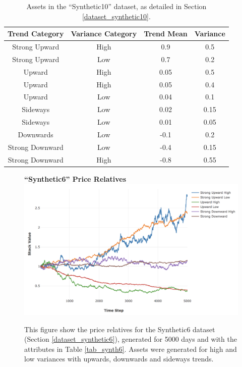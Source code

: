 \documentclass[a4paper,11pt,oneside]{article}
\theoremstyle{plain}
\theoremstyle{definition}
\begin{document}
	\begin{table}[H]
		\centering
		\small
		\begin{tabular}{|c|c|c|c|}
			\hline
			\textbf{Trend Category} &\textbf{Variance Category} & \textbf{Trend Mean} & \textbf{Variance}\\\hline	
			{Strong Upward} 		& {High} & {0.9} & {0.5} \\\hline
			{Strong Upward} 		& {Low} & {0.7} & {0.2} \\\hline
			{Upward} 					& {High} & {0.05} & {0.5} \\\hline
			{Upward} 					& {High} & {0.05} & {0.4} \\\hline
			{Upward} 					& {Low} & {0.04} & {0.1} \\\hline
			{Sideways} 					& {Low} & {0.02} & {0.15} \\\hline
			{Sideways}					& {Low} & {0.01} & {0.05} \\\hline
			{Downwards}				& {Low} & {-0.1} & {0.2} \\\hline
			{Strong Downward} 	& {Low} & {-0.4} & {0.15} \\\hline
			{Strong Downward}	& {High} & {-0.8} & {0.55} \\\hline
		\end{tabular}
		\newline\newline
		\caption{Assets in the ``Synthetic10'' dataset, as detailed in Section \ref{dataset_synthetic10}.}\label{tab_synth10}
	\end{table}
	
	\begin{figure}[H]
		\centering
		\textbf{``Synthetic6'' Price Relatives}
		\includegraphics[scale=0.45]{images/results/prices/synthetic6_prices.png} 
		\caption[Synthetic6 Price Relatives]{This figure show the price relatives for the Synthetic6 dataset (Section \ref{dataset_synthetic6}), generated for 5000 days and with the attributes in Table \ref{tab_synth6}. Assets were generated for high and low variances with upwards, downwards and sideways trends.}
		\label{figure-synthetic6_prices}
	\end{figure}
	
\end{document}
